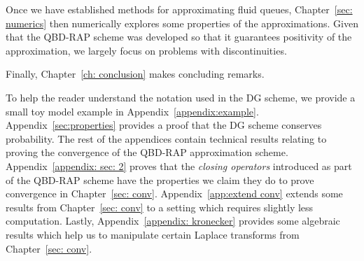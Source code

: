 Once we have established methods for approximating fluid queues, Chapter~\ref{sec: numerics} then numerically explores some properties of the approximations. Given that the QBD-RAP scheme was developed so that it guarantees positivity of the approximation, we largely focus on problems with discontinuities. 

Finally, Chapter~\ref{ch: conclusion} makes concluding remarks. 

To help the reader understand the notation used in the DG scheme, we provide a small toy model example in Appendix~\ref{appendix:example}. Appendix~\ref{sec:properties} provides a proof that the DG scheme conserves probability. The rest of the appendices contain technical results relating to proving the convergence of the QBD-RAP approximation scheme. Appendix~\ref{appendix: sec: 2} proves that the \emph{closing operators} introduced as part of the QBD-RAP scheme have the properties we claim they do to prove convergence in Chapter~\ref{sec: conv}. Appendix~\ref{app:extend conv} extends some results from Chapter~\ref{sec: conv} to a setting which requires slightly less computation. Lastly, Appendix~\ref{appendix: kronecker} provides some algebraic results which help us to manipulate certain Laplace transforms from Chapter~\ref{sec: conv}.

